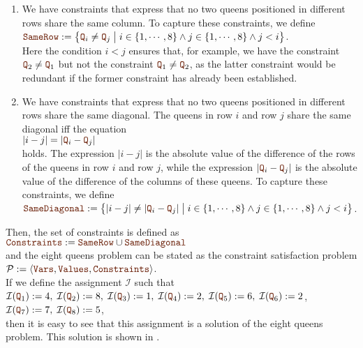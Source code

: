 \begin{enumerate}
\item We have constraints that express that no two queens positioned in different rows share the same column.
      To capture these constraints, we define
      \\[0.2cm]
      \hspace*{1.3cm}
      $\mytt{SameRow} := \bigl\{ \mytt{Q}_i \not= \mytt{Q}_j \bigm| i \in \{1,\cdots,8\} \wedge j \in \{1,\cdots,8\} \wedge j < i \bigr\}$.
      \\[0.2cm]
      Here the condition $i < j$ ensures that, for example, we have the constraint $\mytt{Q}_2 \not= \mytt{Q}_1$
      but not the constraint  $\mytt{Q}_1 \not= \mytt{Q}_2$, as the latter constraint would be redundant if
      the former constraint has already been established.
\item We have constraints that express that no two queens positioned in different rows share the same 
      diagonal.  The queens in row $i$ and row $j$ share the same diagonal iff the equation
      \\[0.2cm]
      \hspace*{1.3cm}
      $|i - j| = |\mytt{Q}_i - \mytt{Q}_j|$
      \\[0.2cm]
      holds.  The expression $|i-j|$ is the absolute value of the difference of the rows of the queens in row
      $i$ and row $j$,  while the expression $|\mytt{Q}_i - \mytt{Q}_j|$ is the absolute value of the difference of the
      columns of these queens.  To capture these constraints, we define
      \\[0.2cm]
      \hspace*{1.3cm}
      $\mytt{SameDiagonal} := \bigl\{ |i  - j| \not= |\mytt{Q}_i - \mytt{Q}_j| \bigm| i \in \{1,\cdots,8\} \wedge j \in \{1,\cdots,8\} \wedge j < i \bigr\}$.
\end{enumerate}
Then, the set of constraints is defined as 
\\[0.2cm]
\hspace*{1.3cm}
$\mytt{Constraints} := \mytt{SameRow} \cup \mytt{SameDiagonal}$
\\[0.2cm]
and the eight queens problem can be stated as the constraint satisfaction problem
\\[0.2cm]
\hspace*{1.3cm}
$\mathcal{P} := \langle \mytt{Vars}, \mytt{Values}, \mytt{Constraints} \rangle$.
\\[0.2cm]
If we define the assignment $\mathcal{I}$ such that
\\[0.2cm]
\hspace*{1.3cm}
$\mathcal{I}(\mytt{Q}_1) := 4,\; \mathcal{I}(\mytt{Q}_2) := 8,\; \mathcal{I}(\mytt{Q}_3) := 1,\;
\mathcal{I}(\mytt{Q}_4) := 2,\; \mathcal{I}(\mytt{Q}_5) := 6,\; \mathcal{I}(\mytt{Q}_6) := 2$,
\\[0.2cm]
\hspace*{1.3cm}
$\mathcal{I}(\mytt{Q}_7) := 7,\; \mathcal{I}(\mytt{Q}_8) := 5$,
\\[0.2cm]
then it is easy to see that this assignment is a solution of the eight queens problem.  This solution is shown
in .


